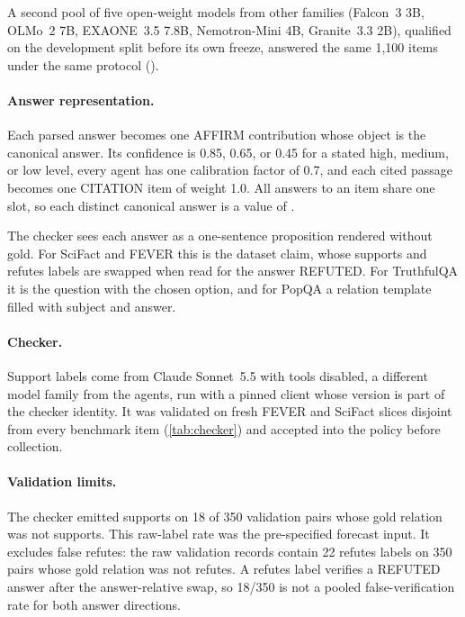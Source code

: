 A second pool of five open-weight models from other families (Falcon~3 3B, OLMo~2 7B, EXAONE~3.5 7.8B, Nemotron-Mini 4B, Granite~3.3 2B), qualified on the development split before its own freeze, answered the same 1,100 items under the same protocol ().

\paragraph{Answer representation.} Each parsed answer becomes one AFFIRM contribution whose object is the canonical answer. Its confidence is 0.85, 0.65, or 0.45 for a stated high, medium, or low level, every agent has one calibration factor of 0.7, and each cited passage becomes one CITATION item of weight 1.0. All answers to an item share one slot, so each distinct canonical answer is a value of .

The checker sees each answer as a one-sentence proposition rendered without gold. For SciFact and FEVER this is the dataset claim, whose supports and refutes labels are swapped when read for the answer REFUTED. For TruthfulQA it is the question with the chosen option, and for PopQA a relation template filled with subject and answer.

\paragraph{Checker.} Support labels come from Claude Sonnet~5.5 with tools disabled, a different model family from the agents, run with a pinned client whose version is part of the checker identity. It was validated on fresh FEVER and SciFact slices disjoint from every benchmark item (\cref{tab:checker}) and accepted into the policy before collection.

\paragraph{Validation limits.} The checker emitted supports on 18 of 350 validation pairs whose gold relation was not supports. This raw-label rate was the pre-specified forecast input. It excludes false refutes: the raw validation records contain 22 refutes labels on 350 pairs whose gold relation was not refutes. A refutes label verifies a REFUTED answer after the answer-relative swap, so 18/350 is not a pooled false-verification rate for both answer directions.

